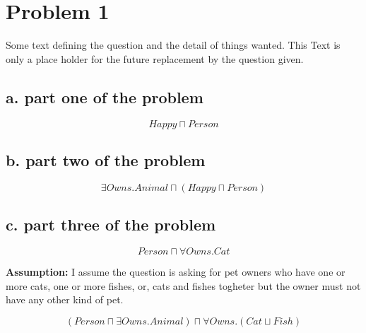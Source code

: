 \section{Problem 1}

Some text defining the question and the detail of things wanted. This
Text is only a place holder for the future replacement by the question
given.

\subsection{a. part one of the problem}

\[
Happy \sqcap Person
\]

\subsection{b. part two of the problem}

\[
\exists Owns.Animal \sqcap (Happy \sqcap Person)
\]

\subsection{c. part three of the problem}

\[
Person \sqcap \forall Owns.Cat
\]

\textbf{Assumption:}
I assume the question is asking for pet owners who have one or more cats,
one or more fishes, or, cats and fishes togheter but the owner must not
have any other kind of pet.

\[
(Person \sqcap \exists Owns.Animal) \sqcap \forall Owns.(Cat \sqcup Fish)
\]
